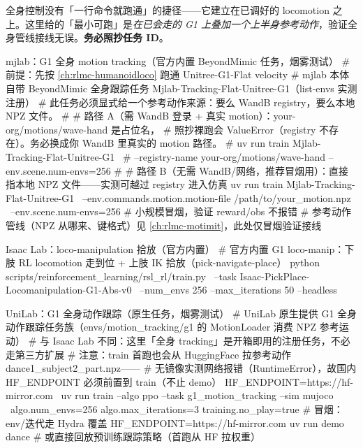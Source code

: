 全身控制没有「一行命令就跑通」的捷径——它建立在已调好的 locomotion 之上。这里给的「最小可跑」是\emph{在已会走的 G1 上叠加一个上半身参考动作}，验证全身管线接线无误。\textbf{务必照抄任务 ID}。

\begin{codebox}[bash]{mjlab：G1 全身 motion tracking（官方内置 BeyondMimic 任务，烟雾测试）}
# 前提：先按 \cref{ch:rlmc-humanoidloco} 跑通 Unitree-G1-Flat velocity
# mjlab 本体自带 BeyondMimic 全身跟踪任务 Mjlab-Tracking-Flat-Unitree-G1（list-envs 实测注册）
# 此任务必须显式给一个参考动作来源：要么 WandB registry，要么本地 NPZ 文件。
#
# 路径 A（需 WandB 登录 + 真实 motion）：your-org/motions/wave-hand 是占位名，
#   照抄裸跑会 ValueError（registry 不存在）。务必换成你 WandB 里真实的 motion 路径。
# uv run train Mjlab-Tracking-Flat-Unitree-G1 \
#   --registry-name your-org/motions/wave-hand --env.scene.num-envs=256
#
# 路径 B（无需 WandB/网络，推荐冒烟用）：直接指本地 NPZ 文件——实测可越过 registry 进入仿真
uv run train Mjlab-Tracking-Flat-Unitree-G1 \
  --env.commands.motion.motion-file /path/to/your_motion.npz \
  --env.scene.num-envs=256        # 小规模冒烟，验证 reward/obs 不报错
# 参考动作管线（NPZ 从哪来、键格式）见 \cref{ch:rlmc-motimit}，此处仅冒烟验证接线
\end{codebox}

\begin{codebox}[bash]{Isaac Lab：loco-manipulation 拾放（官方内置）}
# 官方内置 G1 loco-manip：下肢 RL locomotion 走到位 + 上肢 IK 拾放（pick-navigate-place）
python scripts/reinforcement_learning/rsl_rl/train.py \
  --task Isaac-PickPlace-Locomanipulation-G1-Abs-v0 \
  --num_envs 256 --max_iterations 50 --headless
\end{codebox}

\begin{codebox}[bash]{UniLab：G1 全身动作跟踪（原生任务，烟雾测试）}
# UniLab 原生提供 G1 全身动作跟踪任务族（envs/motion_tracking/g1 的 MotionLoader 消费 NPZ 参考运动）
# 与 Isaac Lab 不同：这里「全身 tracking」是开箱即用的注册任务，不必走第三方扩展
# 注意：train 首跑也会从 HuggingFace 拉参考动作 dance1_subject2_part.npz——
# 无镜像实测网络报错（RuntimeError），故国内 HF_ENDPOINT 必须前置到 train（不止 demo）
HF_ENDPOINT=https://hf-mirror.com \
uv run train --algo ppo --task g1_motion_tracking --sim mujoco \
    algo.num_envs=256 algo.max_iterations=3 training.no_play=true   # 冒烟：env/迭代走 Hydra 覆盖
HF_ENDPOINT=https://hf-mirror.com uv run demo dance   # 或直接回放预训练跟踪策略（首跑从 HF 拉权重）
\end{codebox}

